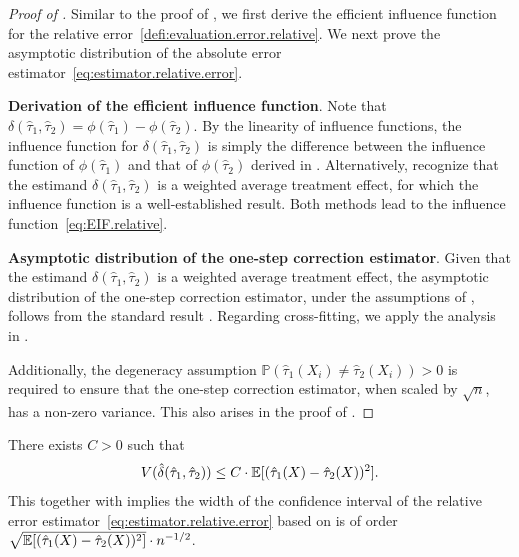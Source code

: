 \begin{proof}[Proof of ]
    Similar to the proof of ,  we first derive the efficient influence function for the relative error~\eqref{defi:evaluation.error.relative}. 
    We next prove the asymptotic distribution of the absolute error estimator~\eqref{eq:estimator.relative.error}.

    \noindent \textbf{Derivation of the efficient influence function}.
    Note that $\delta(\hat{\tau}_1, \hat{\tau}_2) = \phi(\hat{\tau}_1) - \phi(\hat{\tau}_2)$. By the linearity of influence functions, the influence function for $\delta(\hat{\tau}_1, \hat{\tau}_2)$ is simply the difference between the influence function of $\phi(\hat{\tau}_1)$ and that of $\phi(\hat{\tau}_2)$ derived in . 
    Alternatively, recognize that the estimand $\delta(\hat{\tau}_1, \hat{\tau}_2)$ is a weighted average treatment effect, for which the influence function is a well-established result.
    Both methods lead to the influence function~\eqref{eq:EIF.relative}.


    \noindent \textbf{Asymptotic distribution of the one-step correction estimator}.
    Given that the estimand $\delta(\hat{\tau}_1, \hat{\tau}_2)$ is a weighted average treatment effect, the asymptotic distribution of the one-step correction estimator, under the assumptions of , follows from the standard result \parencite{kennedy2022semiparametric}. 
    Regarding cross-fitting, we apply the analysis in \cite{chernozhukov2018double}. 
    
    Additionally, the degeneracy assumption $\mathbb{P}(\hat{\tau}_1(X_i) \neq \hat{\tau}_2(X_i)) > 0$ is required to ensure that the one-step correction estimator, when scaled by $\sqrt{n}$, has a non-zero variance. 
    This also arises in the proof of .
\end{proof}


\begin{proposition}\label{prop:relative.error.CI.width}
    There exists $C > 0$ such that
    \begin{align*}
        V(\hat{\delta}(\hat{\tau}_1, \hat{\tau}_2)) \le C \cdot \mathbb{E}[(\hat{\tau}_1(X) - \hat{\tau}_2(X))^2].
    \end{align*}
    This together with  implies the width of the confidence interval of the relative error estimator~\eqref{eq:estimator.relative.error} based on  is of order $\sqrt{\mathbb{E}[(\hat{\tau}_1(X) - \hat{\tau}_2(X))^2]} \cdot {n}^{-1/2}$.
\end{proposition}


